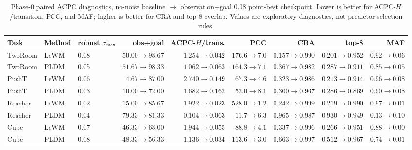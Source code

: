 \documentclass[10pt]{article}
\newcommand{\stdmax}{\ensuremath{\sigma_{\max}}}
\begin{document}
\begin{landscape}
\begin{table}[p]
\centering
\caption{Phase-0 paired ACPC diagnostics, no-noise baseline $\to$ observation+goal 0.08 point-best checkpoint. Lower is better for ACPC-$H$/transition, PCC, and MAF; higher is better for CRA and top-8 overlap. Values are exploratory diagnostics, not predictor-selection rules.}
\label{tab:acpc-phase0}
\small
\setlength{\tabcolsep}{5pt}
\begin{tabular}{lllrrrrrr}
\toprule
Task & Method & robust \stdmax{} & obs+goal & ACPC-$H$/trans. & PCC & CRA & top-8 & MAF \\
\midrule
TwoRoom & LeWM & 0.08 & $50.00 \to 98.67$ & $1.254 \to 0.042$ & $176.6 \to 7.0$ & $0.157 \to 0.990$ & $0.201 \to 0.952$ & $0.92 \to 0.06$ \\
TwoRoom & PLDM & 0.05 & $51.67 \to 98.33$ & $1.062 \to 0.063$ & $164.3 \to 7.1$ & $0.367 \to 0.982$ & $0.287 \to 0.911$ & $0.85 \to 0.05$ \\
PushT & LeWM & 0.06 & $4.67 \to 87.00$ & $2.740 \to 0.149$ & $67.3 \to 4.6$ & $0.323 \to 0.986$ & $0.213 \to 0.914$ & $0.96 \to 0.08$ \\
PushT & PLDM & 0.03 & $10.00 \to 72.00$ & $1.682 \to 0.162$ & $52.0 \to 8.1$ & $0.300 \to 0.967$ & $0.286 \to 0.869$ & $0.90 \to 0.08$ \\
Reacher & LeWM & 0.02 & $15.00 \to 85.67$ & $1.922 \to 0.023$ & $528.0 \to 1.2$ & $0.242 \to 0.999$ & $0.219 \to 0.990$ & $0.97 \to 0.01$ \\
Reacher & PLDM & 0.04 & $79.33 \to 81.33$ & $0.104 \to 0.063$ & $11.7 \to 6.3$ & $0.965 \to 0.987$ & $0.930 \to 0.949$ & $0.13 \to 0.10$ \\
Cube & LeWM & 0.07 & $46.33 \to 68.00$ & $1.944 \to 0.055$ & $88.8 \to 4.1$ & $0.337 \to 0.996$ & $0.266 \to 0.951$ & $0.88 \to 0.00$ \\
Cube & PLDM & 0.08 & $48.33 \to 56.33$ & $1.136 \to 0.034$ & $113.6 \to 3.0$ & $0.663 \to 0.997$ & $0.512 \to 0.967$ & $0.74 \to 0.01$ \\
\bottomrule
\end{tabular}%
\end{table}
\end{landscape}
\end{document}

